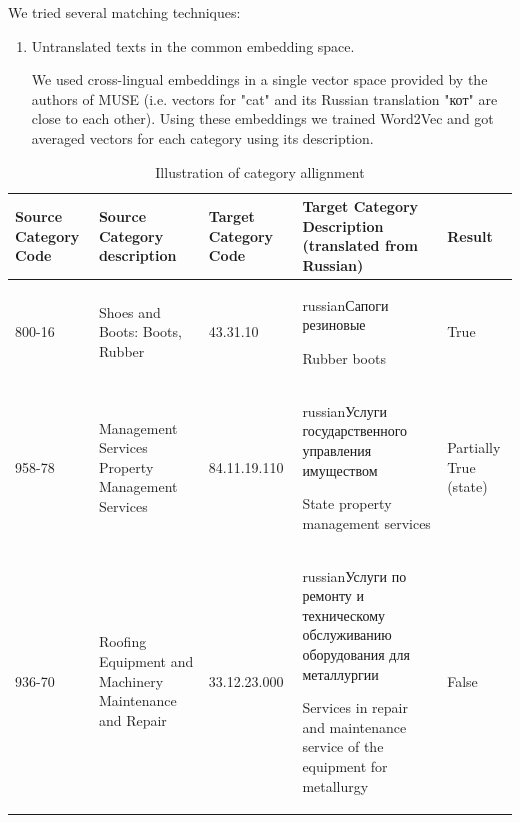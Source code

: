 \documentclass[11pt,a4paper]{article}
\begin{document}
We tried several matching techniques:
\begin{enumerate}

	\item Untranslated texts in the common embedding space.
	
	We used cross-lingual embeddings in a single vector space provided by the authors of MUSE (i.e. vectors for "cat" and its Russian translation \foreignlanguage{russian}{"кот"} are close to each other). Using these embeddings we trained Word2Vec and got averaged vectors for each category using its description.
\end{enumerate}

\begin{center}
	\begin{table}[t!]
		\label{table-annotation}		
		\small
		\centering
		\caption{Illustration of category allignment}
		\begin{tabular}{|p{2cm}|p{4cm}|p{2cm}|p{4cm}|p{1cm}|}
			\hline			
			{Source Category Code} & {Source Category description}& {Target Category Code} & {Target Category Description (translated from Russian)} & {Result}\\
			\hline
			{800-16} & {Shoes and Boots: Boots, Rubber} &
			{43.31.10} & {\begin{otherlanguage*}{russian}Сапоги резиновые\end{otherlanguage*} \newline Rubber boots} &
			{True}
			\\
			\hline
			958-78 & Management Services Property Management Services &
			{84.11.19.110} & \begin{otherlanguage*}{russian}Услуги государственного управления имуществом\end{otherlanguage*} \newline State property management services &
			Partially True (state)
			\\
			\hline
			936-70 & {Roofing Equipment and Machinery Maintenance and Repair} &
			{33.12.23.000} & \begin{otherlanguage*}{russian}Услуги по ремонту и техническому обслуживанию оборудования для металлургии
			\end{otherlanguage*} \newline Services in repair and maintenance service of the equipment for metallurgy &
			False 
			\\
			\hline

			
		\end{tabular}
	\end{table}
\end{center}
\end{document}
